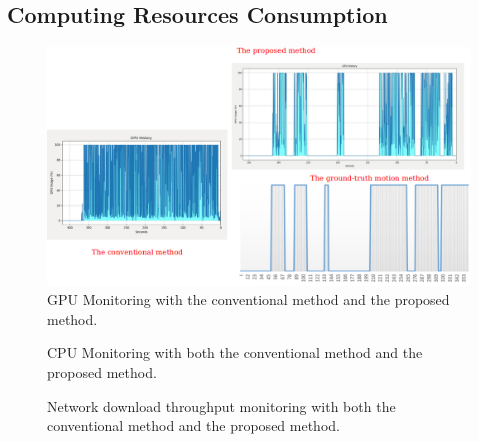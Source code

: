  \subsection{Computing Resources Consumption}
\begin{figure}
\centering
	\includegraphics[scale=0.35]{Figures/gpu_compare.png}
\caption{GPU Monitoring with the conventional method and the proposed method.}
\label{fig:gpu}
\end{figure}
\begin{figure}
\centering
{}
\caption{CPU Monitoring with both the conventional method and the proposed method.}
\label{fig:cpu}
\end{figure}
\begin{figure}
\centering
{}
\caption{Network download throughput monitoring with both the conventional method and the proposed method.}
\label{fig:network}
\end{figure}
